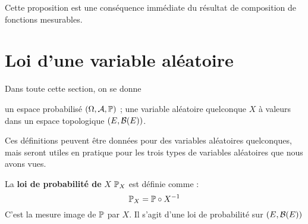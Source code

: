 \documentclass[../integ-proba.tex]{subfiles}
\begin{document}
    \begin{rem}
        Cette proposition est une conséquence immédiate du résultat de composition de fonctions mesurables.
    \end{rem}

    \section{Loi d'une variable aléatoire}

    Dans toute cette section, on se donne
    \begin{itemize}
        \itemb un espace probabilisé $\left(\Omega, \mathcal{A}, \mathbb{P}\right)$ ;
        \itemb une variable aléatoire quelconque $X$ à valeurs dans un espace topologique $\left(E, \mathcal{B}(E)\right)$.
    \end{itemize}

    Ces définitions peuvent être données pour des variables aléatoires quelconques, mais seront utiles en pratique pour les trois types de variables aléatoires que nous avons vues.

    \begin{defi}
        La \textbf{loi de probabilité de} $X$ $\mathbb{P}_X$ est définie comme :
        \begin{displaymath}
            \mathbb{P}_X=\mathbb{P} \circ X^{-1}
        \end{displaymath}
        C'est la mesure image de $\mathbb{P}$ par $X$.
        Il s'agit d'une loi de probabilité sur $\left(E, \mathcal{B}(E) \right)$
    \end{defi}
\end{document}
